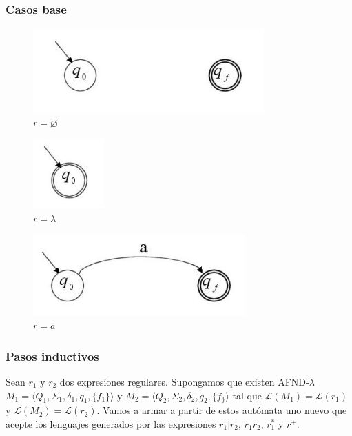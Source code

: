 \subsubsection{Casos base}
\begin{figure}[H]
  \begin{center}
    \caption*{\(r=\varnothing\)}
    \includegraphics[scale=0.5]{imagenes/nothing}
  \end{center}
\end{figure}
\begin{figure}[H]
  \begin{center}
    \caption*{\(r=\lambda\)}
    \includegraphics[scale=0.5]{imagenes/lambda}
  \end{center}
\end{figure}
\begin{figure}[H]
  \begin{center}
    \caption*{\(r=a\)}
    \includegraphics[scale=0.5]{imagenes/a}
  \end{center}
\end{figure}

\subsubsection{Pasos inductivos}
Sean \(r_1\) y \(r_2\) dos expresiones regulares. Supongamos que existen AFND-\(\lambda\) \\ \(M_1=\langle Q_1, \Sigma_1, \delta_1, q_1, \{f_1\}\rangle\) y \(M_2 =\langle Q_2, \Sigma_2, \delta_2, q_2, \{f_\}\rangle\) tal que \(\mathcal{L}(M_1) = \mathcal{L}(r_1)\) y \(\mathcal{L}(M_2) = \mathcal{L}(r_2)\). Vamos a armar a partir de estos autómata uno nuevo que acepte los lenguajes generados por las expresiones \(r_1|r_2\), \(r_1r_2\), \(r_1^*\) y \(r^+\).


